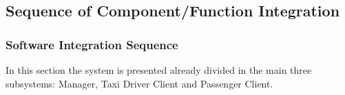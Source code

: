 \documentclass[18pt,oneside,a4paper, titlepage]{article}
\begin{document}
	\subsection{Sequence of	Component/Function Integration}
		\subsubsection{Software	Integration	Sequence}
			In this section the system is presented already divided in the main three subsystems: Manager, Taxi Driver Client and Passenger Client.
\end{document}

